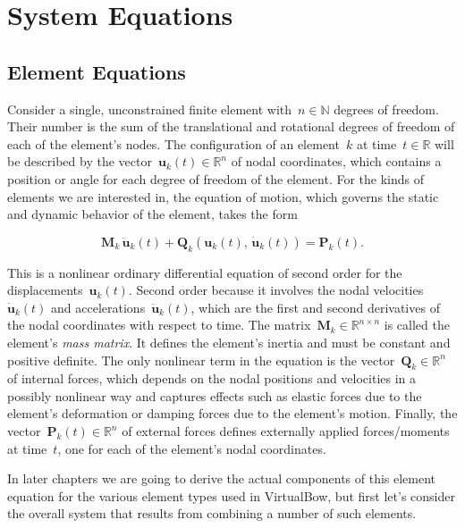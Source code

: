 
\chapter{System Equations}
\label{chap:system-equations}

\section{Element Equations}

Consider a single, unconstrained finite element with~$n \in \mathbb{N}$ degrees of freedom.
Their number is the sum of the translational and rotational degrees of freedom of each of the element's nodes.
The configuration of an element~$k$ at time~$t \in \mathbb{R}$ will be described by the vector~$\boldsymbol{u}_{k}(t) \in \mathbb{R}^n$ of nodal coordinates, which contains a position or angle for each degree of freedom of the element.
For the kinds of elements we are interested in, the equation of motion, which governs the static and dynamic behavior of the element, takes the form

\begin{equation}
\boldsymbol{M}_{k}\,\ddot{\boldsymbol{u}}_{k}(t) + \boldsymbol{Q}_{k}(\boldsymbol{u}_{k}(t),\,\dot{\boldsymbol{u}}_{k}(t)) = \boldsymbol{P}_{k}(t).\label{eq:local-equation-of-motion}
\end{equation}

This is a nonlinear ordinary differential equation of second order for the displacements~$\boldsymbol{u}_{k}(t)$.
Second order because it involves the nodal velocities~$\dot{\boldsymbol{u}}_{k}(t)$ and accelerations~$\ddot{\boldsymbol{u}}_{k}(t)$, which are the first and second derivatives of the nodal coordinates with respect to time.
The matrix~$\boldsymbol{M}_{k} \in \mathbb{R}^{n \times n}$ is called the element's \textit{mass matrix}.
It defines the element's inertia and must be constant and positive definite.
The only nonlinear term in the equation is the vector~$\boldsymbol{Q}_{k} \in \mathbb{R}^n$ of internal forces, which depends on the nodal positions and velocities in a possibly nonlinear way and captures effects such as elastic forces due to the element's deformation or damping forces due to the element's motion.
Finally, the vector~$\boldsymbol{P}_{k}(t) \in \mathbb{R}^n$ of external forces defines externally applied forces/moments at time~$t$, one for each of the element's nodal coordinates.

In later chapters we are going to derive the actual components of this element equation for the various element types used in VirtualBow, but first let's consider the overall system that results from combining a number of such elements.

